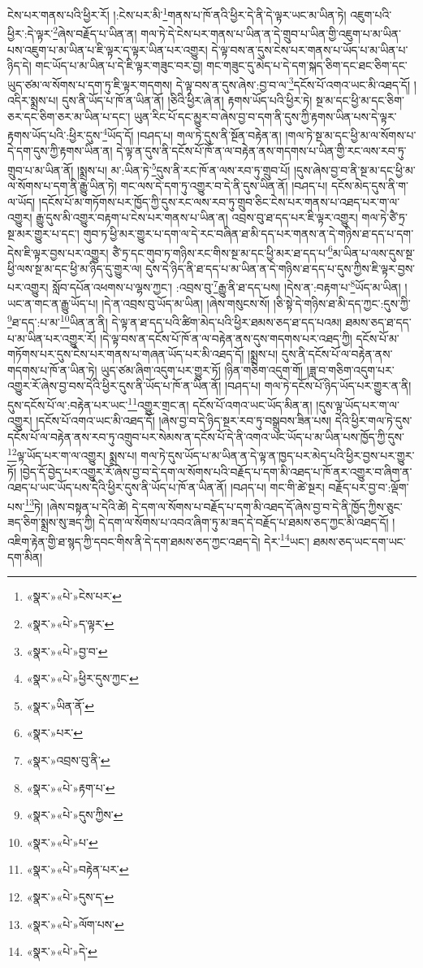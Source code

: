 ངེས་པར་གནས་པའི་ཕྱིར་རོ། །:ངེས་པར་མི་\footnote{«སྣར་»«པེ་»ངེས་པར་}གནས་པ་ཁོ་ནའི་ཕྱིར་དེ་ནི་དེ་ལྟར་ཡང་མ་ཡིན་ཏེ། འཇུག་པའི་ཕྱིར་:དེ་ལྟར་\footnote{«སྣར་»«པེ་»ད་ལྟར་}ཞེས་བརྗོད་པ་ཡིན་ན། གལ་ཏེ་དེ་ངེས་པར་གནས་པ་ཡིན་ན་དེ་གྲུབ་པ་ཡིན་གྱི་འཇུག་པ་མ་ཡིན་པས་འཇུག་པ་མ་ཡིན་པ་ཇི་ལྟར་ད་ལྟར་ཡིན་པར་འགྱུར། དེ་ལྟ་བས་ན་དུས་ངེས་པར་གནས་པ་ཡོད་པ་མ་ཡིན་པ་ཉིད་དེ། གང་ཡོད་པ་མ་ཡིན་པ་དེ་ཇི་ལྟར་གཟུང་བར་བྱ། གང་གཟུང་དུ་མེད་པ་དེ་དག་སྐད་ཅིག་དང་ཐང་ཅིག་དང་ཡུད་ཙམ་ལ་སོགས་པ་དག་ཏུ་ཇི་ལྟར་གདགས། དེ་ལྟ་བས་ན་དུས་ཞེས་:བྱ་བ་ལ་\footnote{«སྣར་»«པེ་»བྱ་བ་}དངོས་པོ་འགའ་ཡང་མི་འཐད་དོ། །འདིར་སྨྲས་པ། དུས་ནི་ཡོད་པ་ཁོ་ན་ཡིན་ནོ། །ཅིའི་ཕྱིར་ཞེ་ན། རྟགས་ཡོད་པའི་ཕྱིར་ཏེ། སྔ་མ་དང་ཕྱི་མ་དང་ཅིག་ཅར་དང་ཅིག་ཅར་མ་ཡིན་པ་དང་། ཡུན་རིང་པོ་དང་མྱུར་བ་ཞེས་བྱ་བ་དག་ནི་དུས་ཀྱི་རྟགས་ཡིན་པས་དེ་ལྟར་རྟགས་ཡོད་པའི་:ཕྱིར་དུས་\footnote{«སྣར་»«པེ་»ཕྱིར་དུས་ཀྱང་}ཡོད་དོ། །བཤད་པ། གལ་ཏེ་དུས་ནི་སྔོན་བརྟེན་ན། །གལ་ཏེ་སྔ་མ་དང་ཕྱི་མ་ལ་སོགས་པ་དེ་དག་དུས་ཀྱི་རྟགས་ཡིན་ན། དེ་ལྟ་ན་དུས་ནི་དངོས་པོ་ཁོ་ན་ལ་བརྟེན་ནས་གདགས་པ་ཡིན་གྱི་རང་ལས་རབ་ཏུ་གྲུབ་པ་མ་ཡིན་ནོ། །སྨྲས་པ། མ་:ཡིན་ཏེ་\footnote{«སྣར་»ཡིན་ནོ་}དུས་ནི་རང་ཁོ་ན་ལས་རབ་ཏུ་གྲུབ་པོ། །དུས་ཞེས་བྱ་བ་ནི་སྔ་མ་དང་ཕྱི་མ་ལ་སོགས་པ་དག་ནི་རྒྱུ་ཡིན་ཏེ། གང་ལས་དེ་དག་ཏུ་འགྱུར་བ་དེ་ནི་དུས་ཡིན་ནོ། །བཤད་པ། དངོས་མེད་དུས་ནི་ག་ལ་ཡོད། །དངོས་པོ་མ་གཏོགས་པར་ཁྱོད་ཀྱི་དུས་རང་ལས་རབ་ཏུ་གྲུབ་ཅིང་ངེས་པར་གནས་པ་འཐད་པར་ག་ལ་འགྱུར། རྒྱུ་དུས་མི་འགྱུར་བརྟག་པ་ངེས་པར་གནས་པ་ཡིན་ན། འབྲས་བུ་ཐ་དད་པར་ཇི་ལྟར་འགྱུར། གལ་ཏེ་ཙཻ་ཏྲ་སྔ་མར་གྱུར་པ་དང་། གུབ་ཏ་ཕྱི་མར་གྱུར་པ་དག་ལ་དེ་རང་བཞིན་ཐ་མི་དད་པར་གནས་ན་དེ་གཉིས་ཐ་དད་པ་དག་དེས་ཇི་ལྟར་བྱས་པར་འགྱུར། ཙཻ་ཏྲ་དང་གུབ་ཏ་གཉིས་རང་གིས་སྔ་མ་དང་ཕྱི་མར་ཐ་དད་པ་\footnote{«སྣར་»པར་}མ་ཡིན་པ་ལས་དུས་སྔ་ཕྱི་ལས་སྔ་མ་དང་ཕྱི་མ་ཉིད་དུ་གྱུར་ལ། དུས་དེ་ཉིད་ནི་ཐ་དད་པ་མ་ཡིན་ན་དེ་གཉིས་ཐ་དད་པ་དུས་ཀྱིས་ཇི་ལྟར་བྱས་པར་འགྱུར། སློབ་དཔོན་འཕགས་པ་ལྷས་ཀྱང་། :འབྲས་བུ་\footnote{«སྣར་»འབྲས་བུ་ནི་}རྒྱུ་ནི་ཐ་དད་པས། །དེས་ན་:བརྟག་པ་\footnote{«སྣར་»«པེ་»རྟག་པ་}ཡོད་མ་ཡིན། །ཡང་ན་གང་ན་རྒྱུ་ཡོད་པ། །དེ་ན་འབྲས་བུ་ཡོད་མ་ཡིན། །ཞེས་གསུངས་སོ། །ཅི་སྟེ་དེ་གཉིས་ཐ་མི་དད་ཀྱང་:དུས་ཀྱི་\footnote{«སྣར་»«པེ་»དུས་ཀྱིས་}ཐ་དད་:པ་མ་\footnote{«སྣར་»«པེ་»པ་}ཡིན་ན་ནི། དེ་ལྟ་ན་ཐ་དད་པའི་ཚིག་མེད་པའི་ཕྱིར་ཐམས་ཅད་ཐ་དད་པའམ། ཐམས་ཅད་ཐ་དད་པ་མ་ཡིན་པར་འགྱུར་རོ། །དེ་ལྟ་བས་ན་དངོས་པོ་ཁོ་ན་ལ་བརྟེན་ནས་དུས་གདགས་པར་འཐད་ཀྱི། དངོས་པོ་མ་གཏོགས་པར་དུས་ངེས་པར་གནས་པ་གཞན་ཡོད་པར་མི་འཐད་དོ། །སྨྲས་པ། དུས་ནི་དངོས་པོ་ལ་བརྟེན་ནས་གདགས་པ་ཁོ་ན་ཡིན་ཏེ། ཡུད་ཙམ་ཞིག་འདུག་པར་གྱུར་ཏོ། །ཉིན་གཅིག་འདུག་གོ། །ཟླ་བ་གཅིག་འདུག་པར་འགྱུར་རོ་ཞེས་བྱ་བས་དེའི་ཕྱིར་དུས་ནི་ཡོད་པ་ཁོ་ན་ཡིན་ནོ། །བཤད་པ། གལ་ཏེ་དངོས་པོ་ཉིད་ཡོད་པར་གྱུར་ན་ནི། དུས་དངོས་པོ་ལ་:བརྟེན་པར་ཡང་\footnote{«སྣར་»«པེ་»བརྟེན་པར་}འགྱུར་གྲང་ན། དངོས་པོ་འགའ་ཡང་ཡོད་མིན་ན། །དུས་ལྟ་ཡོད་པར་ག་ལ་འགྱུར། །དངོས་པོ་འགའ་ཡང་མི་འཐད་དོ། །ཞེས་བྱ་བ་དེ་ཉིད་སྔར་རབ་ཏུ་བསྒྲུབས་ཟིན་པས། དེའི་ཕྱིར་གལ་ཏེ་དུས་དངོས་པོ་ལ་བརྟེན་ནས་རབ་ཏུ་འགྲུབ་པར་སེམས་ན་དངོས་པོ་དེ་ནི་འགའ་ཡང་ཡོད་པ་མ་ཡིན་པས་ཁྱོད་ཀྱི་དུས་\footnote{«སྣར་»«པེ་»དུས་ད་}ལྟ་ཡོད་པར་ག་ལ་འགྱུར། སྨྲས་པ། གལ་ཏེ་དུས་ཡོད་པ་མ་ཡིན་ན་དེ་ལྟ་ན་ཁྱད་པར་མེད་པའི་ཕྱིར་བྱས་པར་གྱུར་ཏོ། །བྱེད་དོ་བྱེད་པར་འགྱུར་རོ་ཞེས་བྱ་བ་དེ་དག་ལ་སོགས་པའི་བརྗོད་པ་དག་མི་འཐད་པ་ཁོ་ནར་འགྱུར་བ་ཞིག་ན་འཐད་པ་ཡང་ཡོད་པས་དེའི་ཕྱིར་དུས་ནི་ཡོད་པ་ཁོ་ན་ཡིན་ནོ། །བཤད་པ། གང་གི་ཚེ་སྔར། བརྗོད་པར་བྱ་བ་:ལྡོག་པས་\footnote{«སྣར་»«པེ་»ལོག་པས་}ཏེ། །ཞེས་བསྟན་པ་དེའི་ཚེ། དེ་དག་ལ་སོགས་པ་བརྗོད་པ་དག་མི་འཐད་དོ་ཞེས་བྱ་བ་དེ་ནི་ཁྱོད་ཀྱིས་ཅུང་ཟད་ཅིག་སྨྲས་སུ་ཟད་ཀྱི། དེ་དག་ལ་སོགས་པ་འབའ་ཞིག་ཏུ་མ་ཟད་དེ་བརྗོད་པ་ཐམས་ཅད་ཀྱང་མི་འཐད་དོ། །འཇིག་རྟེན་གྱི་ཐ་སྙད་ཀྱི་དབང་གིས་ནི་དེ་དག་ཐམས་ཅད་ཀྱང་འཐད་དེ། དེར་\footnote{«སྣར་»«པེ་»དེ་}ཡང་། ཐམས་ཅད་ཡང་དག་ཡང་དག་མིན། 